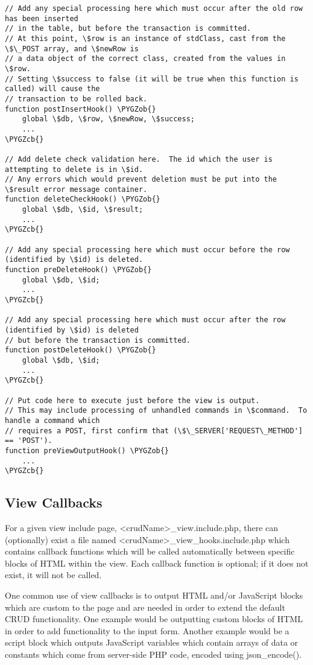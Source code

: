 \documentclass[letterpaper,10pt,english]{sphinxmanual}
\def\PYGZob{\char`\{}
\def\PYGZcb{\char`\}}
\begin{document}
\begin{Verbatim}[commandchars=\\\{\}]
// Add any special processing here which must occur after the old row has been inserted
// in the table, but before the transaction is committed.
// At this point, \$row is an instance of stdClass, cast from the \$\_POST array, and \$newRow is
// a data object of the correct class, created from the values in \$row.
// Setting \$success to false (it will be true when this function is called) will cause the
// transaction to be rolled back.
function postInsertHook() \PYGZob{}
    global \$db, \$row, \$newRow, \$success;
    ...
\PYGZcb{}

// Add delete check validation here.  The id which the user is attempting to delete is in \$id.
// Any errors which would prevent deletion must be put into the \$result error message container.
function deleteCheckHook() \PYGZob{}
    global \$db, \$id, \$result;
    ...
\PYGZcb{}

// Add any special processing here which must occur before the row (identified by \$id) is deleted.
function preDeleteHook() \PYGZob{}
    global \$db, \$id;
    ...
\PYGZcb{}

// Add any special processing here which must occur after the row (identified by \$id) is deleted
// but before the transaction is committed.
function postDeleteHook() \PYGZob{}
    global \$db, \$id;
    ...
\PYGZcb{}

// Put code here to execute just before the view is output.
// This may include processing of unhandled commands in \$command.  To handle a command which
// requires a POST, first confirm that (\$\_SERVER['REQUEST\_METHOD'] == 'POST').
function preViewOutputHook() \PYGZob{}
    ...
\PYGZcb{}
\end{Verbatim}


\subsection{View Callbacks}
\label{jaxFrameworkGuide:view-callbacks}
For a given view include page, \textless{}crudName\textgreater{}\_view.include.php, there can (optionally) exist a file
named \textless{}crudName\textgreater{}\_view\_hooks.include.php which contains callback functions which will be called
automatically between specific blocks of HTML within the view.  Each callback function is optional;
if it does not exist, it will not be called.

One common use of view callbacks is to output HTML and/or JavaScript blocks which are custom to the
page and are needed in order to extend the default CRUD functionality.  One example would be
outputting custom blocks of HTML in order to add functionality to the input form.  Another example
would be a script block which outputs JavaScript variables which contain arrays of data or constants
which come from server-side PHP code, encoded using json\_encode().
\end{document}
